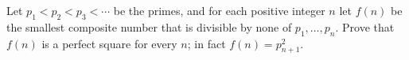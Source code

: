 Let $p_1<p_2<p_3<\cdots$ be the primes, and for each positive integer $n$ let $f(n)$ be the smallest composite number that is divisible by none of $p_1,\dots,p_n$. Prove that $f(n)$ is a perfect square for every $n$; in fact $f(n)=p_{n+1}^2$.
